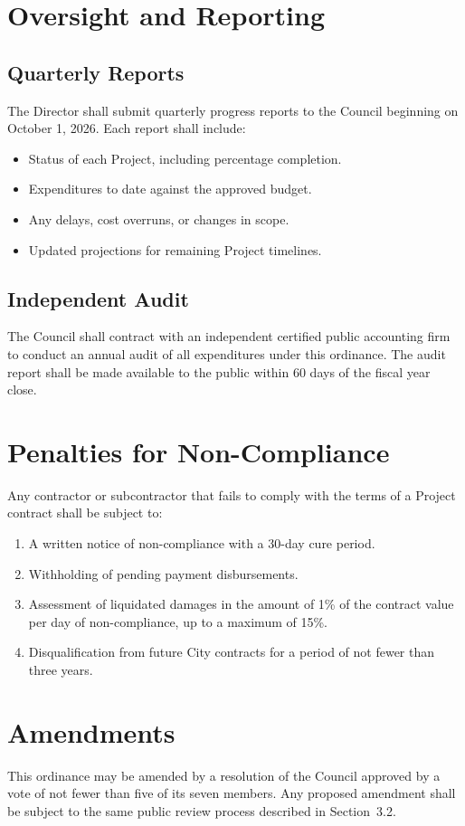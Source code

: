 \documentclass[
    language=english,
    doctype=article,
    institution=none,
]{../../omnilatex}
\begin{document}
\section{Oversight and Reporting}

\subsection{Quarterly Reports}

The Director shall submit quarterly progress reports to the Council
beginning on October 1, 2026. Each report shall include:

\begin{itemize}
    \item Status of each Project, including percentage completion.
    \item Expenditures to date against the approved budget.
    \item Any delays, cost overruns, or changes in scope.
    \item Updated projections for remaining Project timelines.
\end{itemize}

\subsection{Independent Audit}

The Council shall contract with an independent certified public accounting
firm to conduct an annual audit of all expenditures under this ordinance.
The audit report shall be made available to the public within 60 days of
the fiscal year close.

\section{Penalties for Non-Compliance}

Any contractor or subcontractor that fails to comply with the terms of a
Project contract shall be subject to:

\begin{enumerate}
    \item A written notice of non-compliance with a 30-day cure period.
    \item Withholding of pending payment disbursements.
    \item Assessment of liquidated damages in the amount of 1\% of the
        contract value per day of non-compliance, up to a maximum of 15\%.
    \item Disqualification from future City contracts for a period of not
        fewer than three years.
\end{enumerate}

\section{Amendments}

This ordinance may be amended by a resolution of the Council approved by
a vote of not fewer than five of its seven members. Any proposed amendment
shall be subject to the same public review process described in
Section~3.2.

\printbibliography[heading=none]
\end{document}
